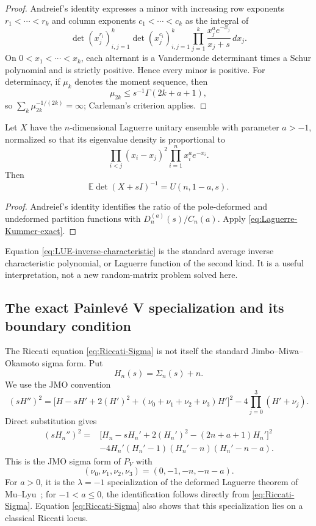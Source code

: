 \begin{proof}
Andreief's identity expresses a minor with increasing row exponents
\(r_1<\cdots<r_k\) and column exponents \(c_1<\cdots<c_k\) as the integral of
\[
 \det(x_j^{r_i})_{i,j=1}^k\det(x_j^{c_i})_{i,j=1}^k
 \prod_{j=1}^k\frac{x_j^ae^{-x_j}}{x_j+s}\,dx_j.
\]
On \(0<x_1<\cdots<x_k\), each alternant is a Vandermonde determinant times
a Schur polynomial and is strictly positive.  Hence every minor is positive.
For determinacy, if \(\mu_k\) denotes the moment sequence, then
\[
 \mu_{2k}\leq s^{-1}\Gamma(2k+a+1),
\]
so \(\sum_k\mu_{2k}^{-1/(2k)}=\infty\); Carleman's criterion applies.
\end{proof}

\begin{corollary}
\label{cor:LUE-inverse-characteristic}
Let \(X\) have the \(n\)-dimensional Laguerre unitary ensemble with parameter
\(a>-1\), normalized so that its eigenvalue density is proportional to
\[
 \prod_{i<j}(x_i-x_j)^2\prod_{i=1}^n x_i^ae^{-x_i}.
\]
Then
\begin{equation}
 \boxed{\mathbb E\det(X+sI)^{-1}=U(n,1-a,s).}
 \label{eq:LUE-inverse-characteristic}
\end{equation}
\end{corollary}

\begin{proof}
Andreief's identity identifies the ratio of the pole-deformed and undeformed
partition functions with \(D_n^{(a)}(s)/C_n(a)\).  Apply
\eqref{eq:Laguerre-Kummer-exact}.
\end{proof}

Equation \eqref{eq:LUE-inverse-characteristic} is the standard average inverse
characteristic polynomial, or Laguerre function of the second kind.  It is a
useful interpretation, not a new random-matrix problem solved here.

\subsection{The exact Painlev\'e V specialization and its boundary condition}

The Riccati equation \eqref{eq:Riccati-Sigma} is not itself the standard
Jimbo--Miwa--Okamoto sigma form.  Put
\[
 H_n(s)=\Sigma_n(s)+n.
\]
We use the JMO convention~\cite[Appendix~C, Eq.~(C.45)]{JimboMiwa1981}
\[
 (sH'')^2=
 \bigl[H-sH'+2(H')^2+(\nu_0+\nu_1+\nu_2+\nu_3)H'\bigr]^2
 -4\prod_{j=0}^3(H'+\nu_j).
\]
Direct substitution gives
\begin{equation}
\begin{split}
 (sH_n'')^2={}&
 \bigl[H_n-sH_n'+2(H_n')^2-(2n+a+1)H_n'\bigr]^2\\
 &-4H_n'(H_n'-1)(H_n'-n)(H_n'-n-a).
\end{split}
\label{eq:JMO-PV}
\end{equation}
This is the JMO sigma form of \(P_V\) with
\[
 (\nu_0,\nu_1,\nu_2,\nu_3)=(0,-1,-n,-n-a).
\]
For \(a>0\), it is the \(\lambda=-1\) specialization of the deformed Laguerre
theorem of Mu--Lyu~\cite{MuLyu2025}; for \(-1<a\leq0\), the identification
follows directly from \eqref{eq:Riccati-Sigma}.  Equation
\eqref{eq:Riccati-Sigma} also shows that this specialization lies on a
classical Riccati locus.

